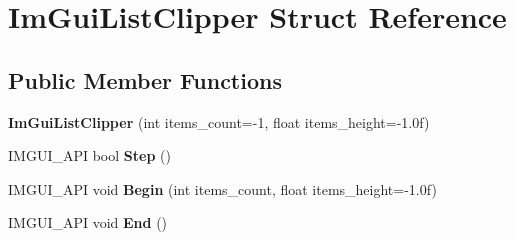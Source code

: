 \hypertarget{structImGuiListClipper}{}\section{Im\+Gui\+List\+Clipper Struct Reference}
\label{structImGuiListClipper}
\subsection*{Public Member Functions}
\begin{DoxyCompactItemize}
\item 
\mbox{\label{structImGuiListClipper_a0dc870fa31a56d3ace7625450f42937a}} 
{\bfseries Im\+Gui\+List\+Clipper} (int items\+\_\+count=-\/1, float items\+\_\+height=-\/1.\+0f)
\item 
\mbox{\label{structImGuiListClipper_ac3e115812c3c4e5a39578a7aa955379a}} 
I\+M\+G\+U\+I\+\_\+\+A\+PI bool {\bfseries Step} ()
\item 
\mbox{\label{structImGuiListClipper_a746fbd724a41dbe88fef4875a2b1e9c7}} 
I\+M\+G\+U\+I\+\_\+\+A\+PI void {\bfseries Begin} (int items\+\_\+count, float items\+\_\+height=-\/1.\+0f)
\item 
\mbox{\label{structImGuiListClipper_a3e6aec0db317985319a78513fc2c8068}} 
I\+M\+G\+U\+I\+\_\+\+A\+PI void {\bfseries End} ()
\end{DoxyCompactItemize}
